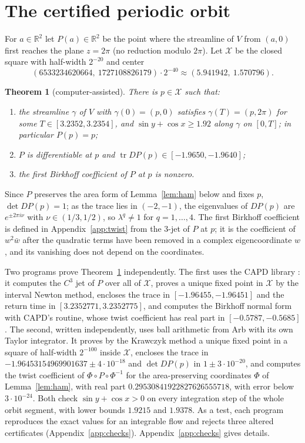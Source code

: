 \documentclass[11pt]{article}
\newtheorem{theorem}{Theorem}
\theoremstyle{definition}
\theoremstyle{remark}
\newcommand{\R}{\mathbb{R}}
\begin{document}
\section{The certified periodic orbit}\label{sec:orbit}
For $a\in\R^2$ let $P(a)\in\R^2$ be the point where the streamline of $V$
from $(a,0)$ first reaches the plane $z=2\pi$ (no reduction modulo $2\pi$).
Let $\mathcal X$ be the closed square with half-width $2^{-20}$ and center
\[
(6533234620664,\ 1727108826179)\cdot2^{-40}\approx(5.941942,\ 1.570796).
\]

\begin{theorem}[computer-assisted]\label{thm:orbit}
There is $p\in\mathcal X$ such that:
\begin{enumerate}
\item the streamline $\gamma$ of $V$ with $\gamma(0)=(p,0)$ satisfies
$\gamma(T)=(p,2\pi)$ for some $T\in[3.2352,3.2354]$, and
$\sin y+\cos x\ge1.92$ along $\gamma$ on $[0,T]$; in particular $P(p)=p$;
\item $P$ is differentiable at $p$ and $\operatorname{tr}DP(p)\in[-1.9650,-1.9640]$;
\item the first Birkhoff coefficient of $P$ at $p$ is nonzero.
\end{enumerate}
\end{theorem}

Since $P$ preserves the area form of Lemma~\ref{lem:ham} below and fixes $p$,
$\det DP(p)=1$; as the trace lies in
$(-2,-1)$, the eigenvalues of $DP(p)$ are $e^{\pm2\pi i\nu}$ with
$\nu\in(1/3,1/2)$, so $\lambda^q\ne1$ for $q=1,\dots,4$. The first Birkhoff
coefficient is defined in Appendix~\ref{app:twist} from the $3$-jet of $P$
at $p$; it is the coefficient of $w^2\bar w$ after the quadratic terms have
been removed in a complex eigencoordinate $w$, and its vanishing does not
depend on the coordinates.

Two programs prove Theorem~\ref{thm:orbit} independently. The first uses the
CAPD library \cite{CAPD}: it computes the $C^3$ jet of $P$ over all of $\mathcal X$,
proves a unique fixed point in $\mathcal X$ by the interval Newton method, encloses the
trace in $[-1.96455,-1.96451]$ and the return time in
$[3.2352771,3.2352775]$, and computes the Birkhoff normal form with CAPD's
routine, whose twist coefficient has real part in $[-0.5787,-0.5685]$. The
second, written independently, uses ball arithmetic from Arb \cite{Arb} with
its own Taylor integrator. It proves by the Krawczyk method a unique fixed
point in a square of half-width $2^{-100}$ inside $\mathcal X$, encloses the trace in
$-1.96453154969901637\pm4\cdot10^{-18}$ and $\det DP(p)$ in $1\pm3\cdot10^{-20}$,
and computes the twist coefficient of $\Phi\circ P\circ\Phi^{-1}$ for the
area-preserving coordinates $\Phi$ of Lemma~\ref{lem:ham}, with real part
$0.29530841922827626555718$, with error below $3\cdot10^{-24}$. Both check
$\sin y+\cos x>0$ on every integration step of the whole orbit segment, with
lower bounds $1.9215$ and $1.9378$. As a test, each program reproduces the
exact values for an integrable flow and rejects three altered certificates
(Appendix~\ref{app:checks}).
Appendix~\ref{app:checks} gives details.
\end{document}
